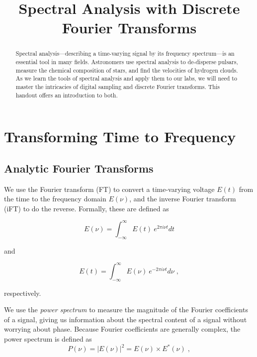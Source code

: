 \documentclass[11pt,preprint]{aastex}
\begin{document}
\title{Spectral Analysis with Discrete Fourier Transforms}


\begin{abstract}
\noindent
Spectral analysis---describing a time-varying signal
by its 
frequency spectrum---is an essential tool in many fields.
Astronomers use spectral analysis to de-disperse pulsars,
measure the chemical composition of stars, and find the velocities of hydrogen clouds. 
As we learn the tools of spectral analysis and apply them to our labs, we
will need to master the intricacies of digital sampling and discrete Fourier
transforms.  This handout offers an introduction to both.
\end{abstract}

\tableofcontents

\section{Transforming Time to Frequency}

\subsection{Analytic Fourier Transforms}

\noindent
We use the Fourier transform (FT) to convert a time-varying
voltage $E(t)$ from the time to the frequency domain $E(\nu)$, and 
the inverse Fourier transform (iFT) to do the reverse.
Formally, these are defined as

\begin{equation}
\label{eqone}
E(\nu) = \int_{-\infty}^{\infty}{E(t)\ e^{2 \pi i \nu t}  dt}
\end{equation}

\noindent
and 

\begin{equation}
 \label{eqoneb}
E(t) = \int_{-\infty}^{\infty} E(\nu)\ e^{-2 \pi i \nu t}  d\nu \; ,
\end{equation}

\noindent
respectively.

We use the {\it power spectrum} to measure the
magnitude of the Fourier coefficients of a signal, giving us information
about the spectral content of a signal without worrying about phase.   
Because Fourier coefficients are generally complex, the power spectrum
is defined as
\begin{equation}
P(\nu ) = \left|E(\nu)\right|^2 = E(\nu ) \times E^*(\nu ) \; ,
\end{equation}
\end{document}
